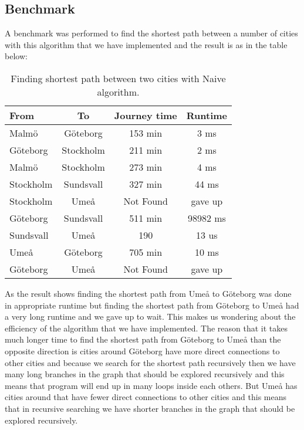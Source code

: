\documentclass[a4paper,11pt]{article}
\begin{document}
\subsection*{Benchmark}
A benchmark was performed to find the shortest path between a number of cities with this algorithm that we have implemented and the result is as in the table below:
\begin{table}[h]
\begin{center}
\begin{tabular}{l|c|c|c}
\textbf{From} & \textbf{To} & \textbf{Journey time} & \textbf{Runtime}\\
\hline
Malmö  &Göteborg &153 min & 3 ms\\
Göteborg   &Stockholm &211 min & 2 ms\\
Malmö  &Stockholm &273 min & 4 ms\\
Stockholm  &Sundsvall &327 min & 44 ms\\
Stockholm  &Umeå &Not Found &gave up \\
Göteborg  &Sundsvall &511 min & 98982 ms\\
Sundsvall  &Umeå &190 & 13 us\\
Umeå  &Göteborg &705 min & 10 ms\\
Göteborg  &Umeå &Not Found & gave up\\
\end{tabular}
\caption{Finding shortest path between two cities with Naive algorithm.}
\label{tab:table1}
\end{center}
\end{table}\newline
As the result shows finding the shortest path from Umeå to Göteborg was done in appropriate runtime but finding the shortest path from Göteborg to Umeå had a very long runtime and we gave up to wait. This makes us wondering about the efficiency of the algorithm that we have implemented. The reason that it takes much longer time to find the shortest path from Göteborg to Umeå than the opposite direction is cities around Göteborg have more direct connections to other cities and because we search for the shortest path recursively then we have many long branches in the graph that should be explored recursively and this means that program will end up in many loops inside each others. But Umeå has cities around that have fewer direct connections to other cities and this means that in recursive searching we have shorter branches in the graph that should be explored recursively.   
\end{document}
